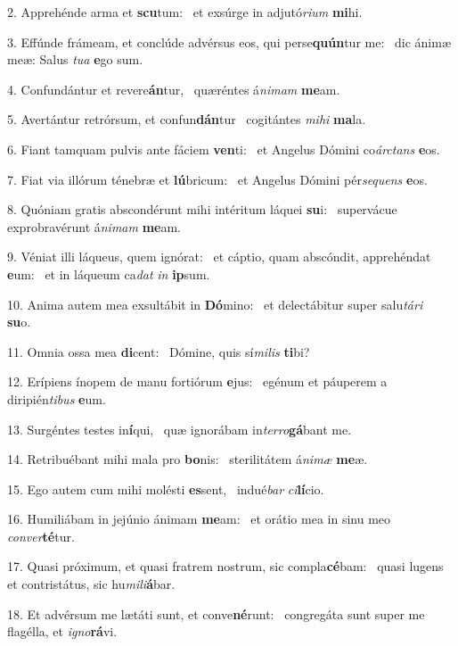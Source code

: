 2. Apprehénde arma et \textbf{scu}tum: \ast\  et exsúrge in adjutó\textit{ri}\textit{um} \textbf{mi}hi.\

3. Effúnde frámeam, et conclúde advérsus eos, qui perse\textbf{quún}tur me: \ast\  dic ánimæ meæ: Salus \textit{tu}\textit{a} \textbf{e}go sum.\

4. Confundántur et revere\textbf{án}tur, \ast\  quæréntes á\textit{ni}\textit{mam} \textbf{me}am.\

5. Avertántur retrórsum, et confun\textbf{dán}tur \ast\  cogitántes \textit{mi}\textit{hi} \textbf{ma}la.\

6. Fiant tamquam pulvis ante fáciem \textbf{ven}ti: \ast\  et Angelus Dómini co\textit{árc}\textit{tans} \textbf{e}os.\

7. Fiat via illórum ténebræ et \textbf{lú}bricum: \ast\  et Angelus Dómini pér\textit{se}\textit{quens} \textbf{e}os.\

8. Quóniam gratis abscondérunt mihi intéritum láquei \textbf{su}i: \ast\  supervácue exprobravérunt á\textit{ni}\textit{mam} \textbf{me}am.\

9. Véniat illi láqueus, quem ignórat: \dag\  et cáptio, quam abscóndit, apprehéndat \textbf{e}um: \ast\  et in láqueum ca\textit{dat} \textit{in} \textbf{ip}sum.\

10. Anima autem mea exsultábit in \textbf{Dó}mino: \ast\  et delectábitur super salu\textit{tá}\textit{ri} \textbf{su}o.\

11. Omnia ossa mea \textbf{di}cent: \ast\  Dómine, quis sí\textit{mi}\textit{lis} \textbf{ti}bi?\

12. Erípiens ínopem de manu fortiórum \textbf{e}jus: \ast\  egénum et páuperem a diripién\textit{ti}\textit{bus} \textbf{e}um.\

13. Surgéntes testes in\textbf{í}qui, \ast\  quæ ignorábam in\textit{ter}\textit{ro}\textbf{gá}bant me.\

14. Retribuébant mihi mala pro \textbf{bo}nis: \ast\  sterilitátem á\textit{ni}\textit{mæ} \textbf{me}æ.\

15. Ego autem cum mihi molésti \textbf{es}sent, \ast\  indué\textit{bar} \textit{ci}\textbf{lí}cio.\

16. Humiliábam in jejúnio ánimam \textbf{me}am: \ast\  et orátio mea in sinu meo \textit{con}\textit{ver}\textbf{té}tur.\

17. Quasi próximum, et quasi fratrem nostrum, sic compla\textbf{cé}bam: \ast\  quasi lugens et contristátus, sic hu\textit{mi}\textit{li}\textbf{á}bar.\

18. Et advérsum me lætáti sunt, et conve\textbf{né}runt: \ast\  congregáta sunt super me flagélla, et \textit{i}\textit{gno}\textbf{rá}vi.\

